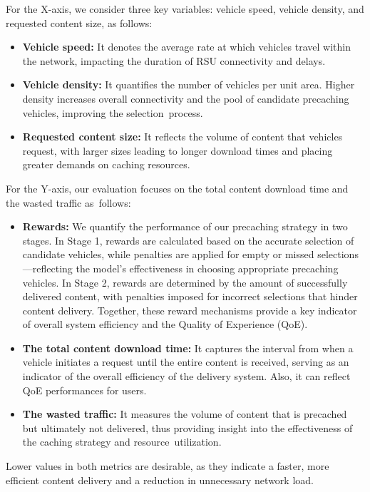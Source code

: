 \documentclass{aims}
\numberwithin{equation}{section}
\begin{document}
For the X-axis, we consider three key variables: vehicle speed, vehicle density, and requested content size, as follows:
\begin{itemize}
    \item \textbf{Vehicle speed:} It denotes the average rate at which vehicles travel within the network, impacting the duration of RSU connectivity and delays.
    \item \textbf{Vehicle density:} It quantifies the number of vehicles per unit area.
    Higher density increases overall connectivity and the pool of candidate precaching vehicles,  improving the selection~process.
    \item \textbf{Requested content size:} It reflects the volume of content that vehicles request, with larger sizes leading to longer download times and placing greater demands on caching resources.
\end{itemize}

For the Y-axis, our evaluation focuses on the total content download time and the wasted traffic as~follows:
\begin{itemize}
    \item \textbf{Rewards:} We quantify the performance of our precaching strategy in two stages.
    In Stage 1, rewards are calculated based on the accurate selection of candidate vehicles, while penalties are applied for empty or missed selections—reflecting the model’s effectiveness in choosing appropriate precaching vehicles.
    In Stage 2, rewards are determined by the amount of successfully delivered content, with penalties imposed for incorrect selections that hinder content delivery.
    Together, these reward mechanisms provide a key indicator of overall system efficiency and the Quality of Experience (QoE).
    \item \textbf{The total content download time:} It captures the interval from when a vehicle initiates a request until the entire content is received, serving as an indicator of the overall efficiency of the delivery system.
    Also, it can reflect QoE performances for users.
    \item \textbf{The wasted traffic:} It measures the volume of content that is precached but ultimately not delivered, thus providing insight into the effectiveness of the caching strategy and resource~utilization.
\end{itemize}
Lower values in both metrics are desirable, as they indicate a faster, more efficient content delivery and a reduction in unnecessary network load.
\end{document}
